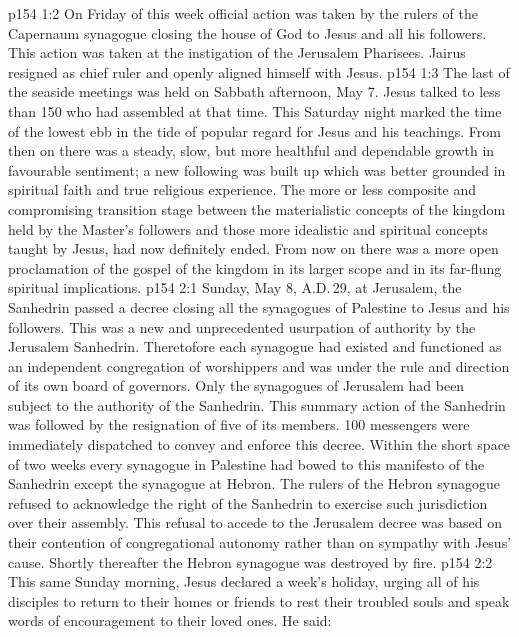 \vs p154 1:2 On Friday of this week official action was taken by the rulers of the Capernaum synagogue closing the house of God to Jesus and all his followers. This action was taken at the instigation of the Jerusalem Pharisees. Jairus resigned as chief ruler and openly aligned himself with Jesus.
\vs p154 1:3 The last of the seaside meetings was held on Sabbath afternoon, May 7. Jesus talked to less than 150 who had assembled at that time. This Saturday night marked the time of the lowest ebb in the tide of popular regard for Jesus and his teachings. From then on there was a steady, slow, but more healthful and dependable growth in favourable sentiment; a new following was built up which was better grounded in spiritual faith and true religious experience. The more or less composite and compromising transition stage between the materialistic concepts of the kingdom held by the Master’s followers and those more idealistic and spiritual concepts taught by Jesus, had now definitely ended. From now on there was a more open proclamation of the gospel of the kingdom in its larger scope and in its far\hyp{}flung spiritual implications.
\vs p154 2:1 Sunday, May 8, A.D.\,29, at Jerusalem, the Sanhedrin passed a decree closing all the synagogues of Palestine to Jesus and his followers. This was a new and unprecedented usurpation of authority by the Jerusalem Sanhedrin. Theretofore each synagogue had existed and functioned as an independent congregation of worshippers and was under the rule and direction of its own board of governors. Only the synagogues of Jerusalem had been subject to the authority of the Sanhedrin. This summary action of the Sanhedrin was followed by the resignation of five of its members. 100 messengers were immediately dispatched to convey and enforce this decree. Within the short space of two weeks every synagogue in Palestine had bowed to this manifesto of the Sanhedrin except the synagogue at Hebron. The rulers of the Hebron synagogue refused to acknowledge the right of the Sanhedrin to exercise such jurisdiction over their assembly. This refusal to accede to the Jerusalem decree was based on their contention of congregational autonomy rather than on sympathy with Jesus’ cause. Shortly thereafter the Hebron synagogue was destroyed by fire.
\vs p154 2:2 \pc This same Sunday morning, Jesus declared a week’s holiday, urging all of his disciples to return to their homes or friends to rest their troubled souls and speak words of encouragement to their loved ones. He said: 

